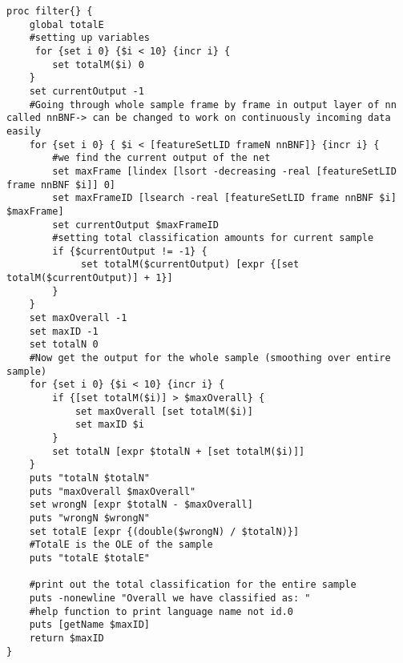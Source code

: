 \newpage
{}
\begin{lstlisting}[label=lst:basic,caption=Evaluation setup to count outputs per sample and count correctness(return value)/OLE (totalE)]
proc filter{} {
    global totalE
    #setting up variables
     for {set i 0} {$i < 10} {incr i} {
        set totalM($i) 0
    }
    set currentOutput -1
    #Going through whole sample frame by frame in output layer of nn called nnBNF-> can be changed to work on continuously incoming data easily
    for {set i 0} { $i < [featureSetLID frameN nnBNF]} {incr i} {
        #we find the current output of the net
        set maxFrame [lindex [lsort -decreasing -real [featureSetLID frame nnBNF $i]] 0]
        set maxFrameID [lsearch -real [featureSetLID frame nnBNF $i] $maxFrame]
        set currentOutput $maxFrameID
        #setting total classification amounts for current sample
        if {$currentOutput != -1} {
             set totalM($currentOutput) [expr {[set totalM($currentOutput)] + 1}]
        }
    }
    set maxOverall -1
    set maxID -1
    set totalN 0
    #Now get the output for the whole sample (smoothing over entire sample)
    for {set i 0} {$i < 10} {incr i} {
        if {[set totalM($i)] > $maxOverall} {
            set maxOverall [set totalM($i)]
            set maxID $i
        }
        set totalN [expr $totalN + [set totalM($i)]]
    }
    puts "totalN $totalN"
    puts "maxOverall $maxOverall"
    set wrongN [expr $totalN - $maxOverall]
    puts "wrongN $wrongN"
    set totalE [expr {(double($wrongN) / $totalN)}]
    #TotalE is the OLE of the sample
    puts "totalE $totalE"

    #print out the total classification for the entire sample
    puts -nonewline "Overall we have classified as: "
    #help function to print language name not id.0
    puts [getName $maxID]
    return $maxID
}
\end{lstlisting}

\newpage


